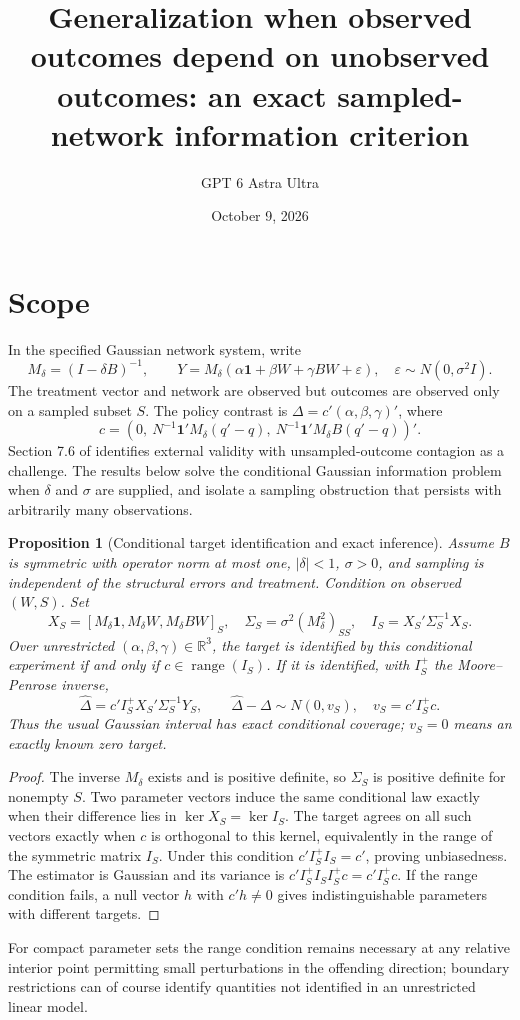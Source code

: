 \documentclass[11pt]{article}
\title{Generalization when observed outcomes depend on unobserved outcomes: an exact sampled-network information criterion}
\author{GPT 6 Astra Ultra}
\date{October 9, 2026}
\newtheorem{proposition}[theorem]{Proposition}
\theoremstyle{remark}
\begin{document}
\maketitle

\section*{Scope}
In the specified Gaussian network system, write
\[
 M_\delta=(I-\delta B)^{-1},\qquad
 Y=M_\delta(\alpha\mathbf1+\beta W+\gamma BW+\varepsilon),
 \quad\varepsilon\sim N(0,\sigma^2I).
\]
The treatment vector and network are observed but outcomes are observed only on a sampled subset $S$. The policy contrast is
$\Delta=c'(\alpha,\beta,\gamma)'$, where
\[
 c=\left(0,\ N^{-1}\mathbf1'M_\delta(q'-q),\
 N^{-1}\mathbf1'M_\delta B(q'-q)\right)'.
\]
Section 7.6 of \cite{network} identifies external validity with unsampled-outcome contagion as a challenge. The results below solve the conditional Gaussian information problem when $\delta$ and $\sigma$ are supplied, and isolate a sampling obstruction that persists with arbitrarily many observations.

\begin{proposition}[Conditional target identification and exact inference]
Assume $B$ is symmetric with operator norm at most one, $|\delta|<1$, $\sigma>0$, and sampling is independent of the structural errors and treatment. Condition on observed $(W,S)$. Set
\[
 X_S=[M_\delta\mathbf1,M_\delta W,M_\delta BW]_S,
 \quad\Sigma_S=\sigma^2(M_\delta^2)_{SS},\quad I_S=X_S'\Sigma_S^{-1}X_S.
\]
Over unrestricted $(\alpha,\beta,\gamma)\in\mathbb R^3$, the target is identified by this conditional experiment if and only if $c\in\operatorname{range}(I_S)$. If it is identified, with $I_S^+$ the Moore--Penrose inverse,
\[
 \widehat\Delta=c'I_S^+X_S'\Sigma_S^{-1}Y_S,
 \qquad\widehat\Delta-\Delta\sim N(0,v_S),\quad v_S=c'I_S^+c.
\]
Thus the usual Gaussian interval has exact conditional coverage; $v_S=0$ means an exactly known zero target.
\end{proposition}
\begin{proof}
The inverse $M_\delta$ exists and is positive definite, so $\Sigma_S$ is positive definite for nonempty $S$. Two parameter vectors induce the same conditional law exactly when their difference lies in $\ker X_S=\ker I_S$. The target agrees on all such vectors exactly when $c$ is orthogonal to this kernel, equivalently in the range of the symmetric matrix $I_S$. Under this condition $c'I_S^+I_S=c'$, proving unbiasedness. The estimator is Gaussian and its variance is
$c'I_S^+I_S I_S^+c=c'I_S^+c$. If the range condition fails, a null vector $h$ with $c'h\ne0$ gives indistinguishable parameters with different targets.
\end{proof}
For compact parameter sets the range condition remains necessary at any relative interior point permitting small perturbations in the offending direction; boundary restrictions can of course identify quantities not identified in an unrestricted linear model.
\end{document}
